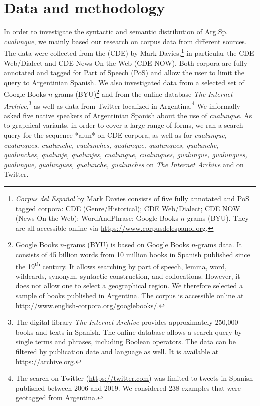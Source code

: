 \documentclass[output=paper,colorlinks,citecolor=brown]{langscibook}
\begin{document}
\section{Data and methodology}\label{sec:fk2}\largerpage
In order to investigate the syntactic and semantic distribution of Arg.Sp. \textit{cualunque}, we mainly based our research on corpus data from different sources. The data were collected from the  (CDE) by Mark Davies,\footnote{\textit{Corpus del Español} by Mark Davies consists of five fully annotated and PoS tagged corpora: CDE (Genre/Historical); CDE Web/Dialect; CDE NOW (News On the Web); WordAndPhrase; Google Books $n$-grams (BYU). They are all accessible online via \url{https://www.corpusdelespanol.org}.}  in particular the CDE Web/Dialect and CDE News On the Web (CDE NOW). Both corpora are fully annotated and tagged for Part of Speech (PoS) and allow the user to limit the query to Argentinian Spanish. We also investigated data from a selected set of Google Books $n$-grams (BYU)\footnote{Google Books $n$-grams (BYU) is based on Google Books $n$-grams data. It consists of 45 billion words from 10 million books in Spanish published since the 19\textsuperscript{th} century. It allows searching by part of speech, lemma, word, wildcards, synonym, syntactic construction, and collocations. However, it does not allow one to select a geographical region. We therefore selected a sample of books published in Argentina. The corpus is accessible online at \url{http://www.english-corpora.org/googlebooks/}.} and from the online database \textit{The Internet Archive},\footnote{The digital library \textit{The Internet Archive} provides approximately 250,000 books and texts in Spanish. The online database allows a search query by single terms and phrases, including Boolean operators. The data can be filtered by publication date and language as well. It is available at \url{https://archive.org}.}  as well as data from Twitter localized in Argentina.\footnote{The search on Twitter (\url{https://twitter.com}) was limited to tweets in Spanish published between 2006 and 2019. We considered 238 examples that were geotagged from Argentina.}  We informally asked five native speakers of Argentinian Spanish about the use of \textit{cualunque}. As to graphical variants, in order to cover a large range of forms, we ran a search query for the sequence *alun* on CDE corpora, as well as for \textit{cualunque, cualunques, cualunche, cualunches, qualunque, qualunques, qualunche, qualunches, qualunje, qualunjes, cualungue, cualunques, gualunque, gualunques, gualungue, gualungues, gualunche, gualunches} on \textit{The Internet Archive} and on Twitter.\largerpage
\end{document}
